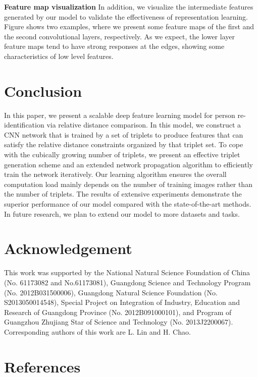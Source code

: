 \documentclass[review]{elsarticle}
\begin{document}
\textbf{Feature map visualization} In addition, we visualize the intermediate features generated by our model to validate the effectiveness of representation learning. Figure  shows two examples, where we present some feature maps of the first and the second convolutional layers, respectively. As we expect, the lower layer feature maps tend to have strong responses at the edges, showing some characteristics of low level features.



\section{Conclusion}
In this paper, we present a scalable deep feature learning model for person re-identification via relative distance comparison.  In this model, we construct a CNN network that is trained by a set of triplets to produce features that can satisfy the relative distance constraints organized by that  triplet set. To cope with the cubically growing number of triplets, we present an effective triplet generation scheme and an extended network propagation algorithm to efficiently train the network iteratively. Our learning algorithm ensures the overall computation load mainly depends on the number of training images rather than the number of triplets. The results of extensive experiments demonstrate the superior performance of our model compared with the state-of-the-art methods. In future research, we plan to extend our model to more datasets and tasks. 

\section*{Acknowledgement}
This work was supported by the National Natural Science Foundation of China (No. 61173082 and No.61173081), Guangdong Science and Technology Program (No. 2012B031500006), Guangdong Natural Science Foundation (No. S2013050014548), Special Project on Integration of Industry, Education and Research of Guangdong Province (No. 2012B091000101), and Program of Guangzhou Zhujiang Star of Science and Technology (No. 2013J2200067). Corresponding authors of this work are L. Lin and H. Chao.

\section*{References}


\end{document}
